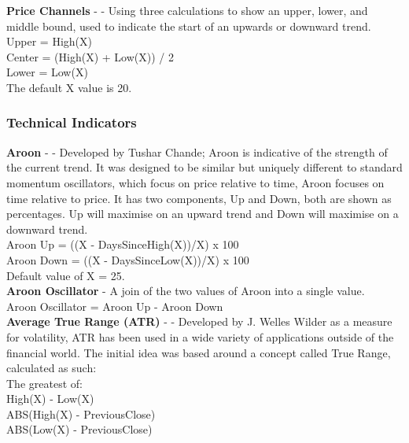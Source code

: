 \documentclass[conference]{IEEEtran}
\begin{document}
\iffalse
[]
\fi

\noindent
\textbf{Price Channels} - \cite{Murphy1999} - Using three calculations to show an upper, lower, and middle bound, used to indicate the start of an upwards or downward trend.\\

\noindent
Upper = High(X)\\
Center = (High(X) + Low(X)) / 2\\
Lower = Low(X)\\
The default X value is 20.

\iffalse
[]
\fi

\iffalse
#################################################################################
\fi

\subsubsection{Technical Indicators}

\textbf{Aroon} - \cite{Chande1994} - Developed by Tushar Chande; Aroon is indicative of the strength of the current trend. It was designed to be similar but uniquely different to standard momentum oscillators, which focus on price relative to time, Aroon focuses on time relative to price. It has two components, Up and Down, both are shown as percentages. Up will maximise on an upward trend and Down will maximise on a downward trend.\\

\noindent
Aroon Up = ((X - DaysSinceHigh(X))/X) x 100\\
Aroon Down = ((X - DaysSinceLow(X))/X) x 100\\
Default value of X = 25.\\

\iffalse
[]
\fi

\noindent
\textbf{Aroon Oscillator} - A join of the two values of Aroon into a single value.\\
\noindent
Aroon Oscillator = Aroon Up - Aroon Down\\

\iffalse
[]
\fi

\noindent
\textbf{Average True Range (ATR)} - \cite{Wilder1978} - Developed by J. Welles Wilder as a measure for volatility, ATR has been used in a wide variety of applications outside of the financial world. The initial idea was based around a concept called True Range, calculated as such:\\

\noindent
The greatest of:\\
High(X) - Low(X)\\
ABS(High(X) - PreviousClose)\\
ABS(Low(X) - PreviousClose)\\
\end{document}
